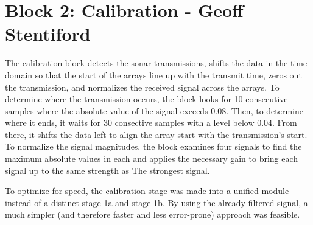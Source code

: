
\section{Block 2: Calibration - Geoff Stentiford}

The calibration block detects the sonar transmissions, shifts the data in the time domain so that the start
 of the arrays line up with the transmit time, zeros out the transmission, and normalizes the received signal
 across the arrays. To determine where the transmission occurs, the block looks for 10 consecutive samples where
 the absolute value of the signal exceeds 0.08. Then, to determine where it ends, it waits for 30 consective
 samples with a level below 0.04. From there, it shifts the data left to align the array start with the
 transmission's start. To normalize the signal magnitudes, the block examines four signals to find the maximum
 absolute values in each and applies the necessary gain to bring each signal up to the same strength as The
 strongest signal.

To optimize for speed, the calibration stage was made into a unified module instead of a distinct stage 1a and
 stage 1b. By using the already-filtered signal, a much simpler (and therefore faster and less error-prone)
 approach was feasible. 